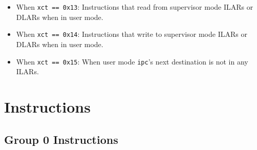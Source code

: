 \documentclass{article}
\begin{document}
\begin{itemize}
	\item When \texttt{xct == 0x13}:
		Instructions that read from supervisor mode ILARs or DLARs when in
		user mode.
	\item When \texttt{xct == 0x14}:
		Instructions that write to supervisor mode ILARs or DLARs when in
		user mode.
	\item When \texttt{xct == 0x15}:
		When user mode \texttt{ipc}'s next destination is not in any ILARs.
	\end{itemize}
	\newpage
\section{Instructions}
	\subsection{Group 0 Instructions}
\end{document}
